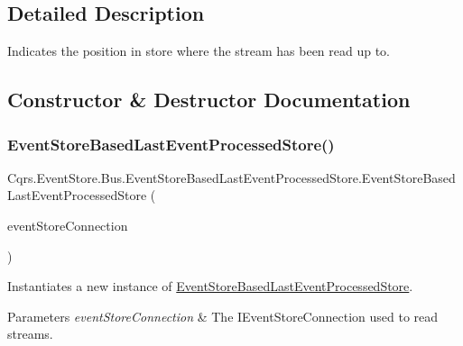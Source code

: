 \subsection{Detailed Description}
Indicates the position in store where the stream has been read up to. 



\subsection{Constructor \& Destructor Documentation}
\mbox{\label{classCqrs_1_1EventStore_1_1Bus_1_1EventStoreBasedLastEventProcessedStore_a54dc3860c38026fd298bd204e3079490_a54dc3860c38026fd298bd204e3079490}} 
\subsubsection{\texorpdfstring{Event\+Store\+Based\+Last\+Event\+Processed\+Store()}{EventStoreBasedLastEventProcessedStore()}}
{\footnotesize\ttfamily Cqrs.\+Event\+Store.\+Bus.\+Event\+Store\+Based\+Last\+Event\+Processed\+Store.\+Event\+Store\+Based\+Last\+Event\+Processed\+Store (\begin{DoxyParamCaption}\item[{I\+Event\+Store\+Connection}]{event\+Store\+Connection }\end{DoxyParamCaption})}



Instantiates a new instance of \hyperlink{classCqrs_1_1EventStore_1_1Bus_1_1EventStoreBasedLastEventProcessedStore}{Event\+Store\+Based\+Last\+Event\+Processed\+Store}. 


\begin{DoxyParams}{Parameters}
{\em event\+Store\+Connection} & The I\+Event\+Store\+Connection used to read streams.\\
\hline
\end{DoxyParams}


